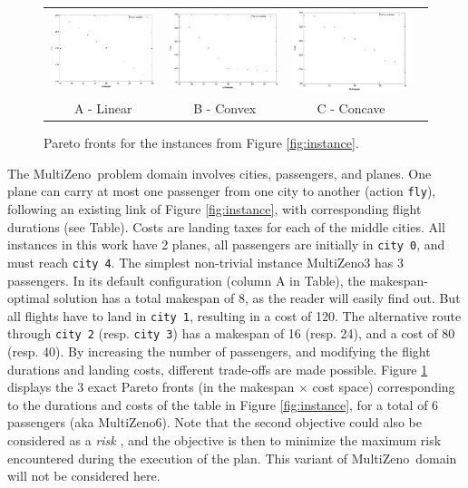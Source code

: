 \documentclass[letterpaper]{article}
\def\MULTIZENO{{\sc MultiZeno}}
\begin{document}
\begin{figure}[tb]
\hskip -0.5cm
\begin{tabular}{cccc}
\includegraphics[width=0.32\columnwidth]{figures/zeno6e10} &
\includegraphics[width=0.32\columnwidth]{figures/zeno6di} &
\includegraphics[width=0.32\columnwidth]{figures/zeno6sc}\\
A - Linear & B - Convex & C - Concave %
\end{tabular}
\caption{Pareto fronts for the instances from Figure \ref{fig:instance}.}
\label{fig:allParetoFronts}
\end{figure}

The \MULTIZENO\ problem domain involves cities, passengers, and planes. One plane can carry at most one passenger from one city to another (action {\tt fly}), following an existing link of Figure \ref{fig:instance}, with corresponding flight durations (see Table). Costs are landing taxes for each of the middle cities. All instances in this work have 2 planes, all passengers are initially in {\tt city 0}, and must reach {\tt city 4}. The simplest non-trivial instance \MULTIZENO3 has 3 passengers. In its default configuration (column A in Table), the makespan-optimal solution has a total makespan of 8, as the reader will easily find out. But all flights have to land in {\tt city 1}, resulting in a cost of 120. The alternative route through  {\tt city 2} (resp. {\tt city 3}) has a makespan of 16 (resp. 24), and a cost of 80 (resp. 40). By increasing the number of passengers, and modifying the flight durations and landing costs, different trade-offs are made possible. Figure \ref{fig:allParetoFronts} displays 
the 3 exact Pareto fronts (in the makespan $\times$ cost space) corresponding to the durations and costs of the table in Figure \ref{fig:instance}, for a total of 6 passengers (aka \MULTIZENO6). 
Note that the second objective could also be considered as a {\em risk} \cite{nous-emo2013}, and the objective is then to minimize the maximum risk encountered during the execution of the plan. This variant of \MULTIZENO\ domain will not be considered here.
\end{document}
